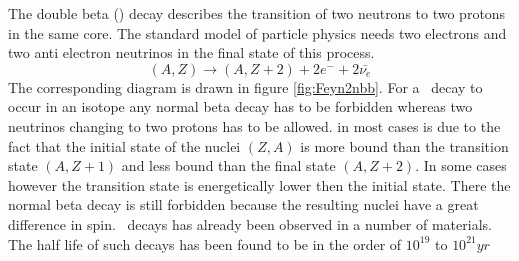 \documentclass[encoding=utf8,british]{tumphthesis}
\begin{document}
The double beta (\twonu) decay describes the transition of two neutrons to two protons in the same core.
The standard model of particle physics needs two electrons and two anti electron neutrinos in the final state of this process.
\begin{equation}
(A,Z)\rightarrow (A,Z+2) + 2e^- + 2\bar{\nu_e}
\end{equation} 
The corresponding diagram is drawn in figure \ref{fig:Feyn2nbb}.
For a \twonu\ decay to occur in an isotope any normal beta decay has to be forbidden whereas two neutrinos changing to two protons has to be allowed.
in most cases is due to the fact that the initial state of the nuclei $(Z,A)$ is more bound than the transition state $(A,Z+1)$ and less bound than the final state $(A,Z+2)$.
In some cases however the transition state is energetically lower then the initial state.
There the normal beta decay is still forbidden because the resulting nuclei have a great difference in spin.
\twonu\ decays has already been observed in a number of materials.
The half life of such decays has been found to be in the order of $10^{19}$ to $10^{21} \unit{yr}$
\\
\end{document}
